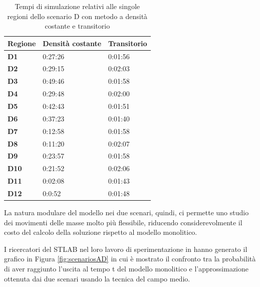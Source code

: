 \begin{table}[h]
  \centering
  \resizebox{0.7\textwidth}{!} {
 \begin{tabular}[t]{ |l|l|l| }
	 	\hline
	\textbf{Regione}	&		\textbf{Densità costante}	&		\textbf{Transitorio}	\\ \hline
	\textbf{D1} 	 &		0:27:26					&		0:01:56		\\ \hline
	\textbf{D2}		 &		0:29:15 				&		0:02:03		\\ \hline
	\textbf{D3}		 &		0:49:46 				&		0:01:58		\\ \hline
	\textbf{D4}		 &		0:29:48 				&		0:02:00		\\ \hline
	\textbf{D5}		 &		0:42:43 				&		0:01:51		\\ \hline
	\textbf{D6}		 &		0:37:23 				&		0:01:40		\\ \hline
	\textbf{D7}		 &		0:12:58 				&		0:01:58		\\ \hline
	\textbf{D8}		 &		0:11:20 				&		0:02:07		\\ \hline
	\textbf{D9}		 &		0:23:57 				&		0:01:58		\\ \hline
	\textbf{D10}	 &		0:21:52 				&		0:02:06		\\ \hline
	\textbf{D11}	 &		0:02:08 				&		0:01:43		\\ \hline
	\textbf{D12}	 &		0:0:52 					&		0:01:48		\\ \hline
	
	
  \end{tabular}
  
  }
  \caption{Tempi di simulazione relativi alle singole regioni dello scenario D con metodo a densità costante e transitorio}
  \label{tab:tabella-dati-simulazioni-D}
\end{table}
 
La natura modulare del modello nei due scenari, quindi, ci permette uno studio dei movimenti delle masse molto più flessibile, riducendo considerevolmente il costo del calcolo della soluzione rispetto al modello monolitico.

I ricercatori del STLAB nel loro lavoro di sperimentazione in \cite{esperimenti-sandro} hanno generato il grafico in Figura \ref{fig:scenariosAD} in cui è mostrato il confronto tra la probabilità di aver raggiunto l'uscita al tempo t del modello monolitico e l'approssimazione ottenuta dai due scenari usando la tecnica del campo medio.

